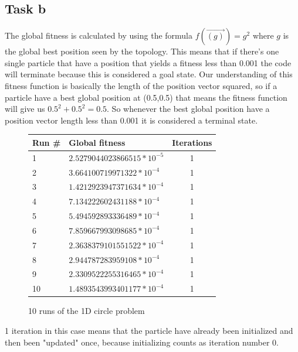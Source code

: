 \documentclass[12pt, a4paper]{article}
\begin{document}
\subsection{Task b}
The global fitness is calculated by using the formula $f(\vec{(g)})=g^2$ where $g$ is the global best position seen by the topology. This means that if there's one single particle that have a position that yields a fitness less than 0.001 the code will terminate because this is considered a goal state. Our understanding of this fitness function is basically the length of the position vector squared, so if a particle have a best global position at (0.5,0.5) that means the fitness function will give us $0.5^2 + 0.5^2 = 0.5$. So whenever the best global position have a position vector length less than 0.001 it is considered a terminal state.
\begin{figure}[H]
\begin{center}
\begin{tabular}{l| l  c}
Run \# & Global fitness& Iterations\\ \hline
1&$2.5279044023866515*10^{-5}$ & 1 \\
2&$3.664100719971322*10^{-4}$ & 1 \\
3&$1.4212923947371634*10^{-4}$ & 1 \\
4&$7.134222602431188*10^{-4}$ & 1 \\
5&$5.494592893336489*10^{-4}$ & 1 \\
6&$7.859667993098685*10^{-4}$ & 1 \\
7&$2.3638379101551522*10^{-4}$ & 1 \\
8&$2.944787283959108*10^{-4}$ & 1 \\
9&$2.3309522255316465*10^{-4}$ & 1 \\
10&$1.4893543993401177*10^{-4}$ & 1 \\
\end{tabular}
\caption{10 runs of the 1D circle problem}
\end{center}
\end{figure}
1 iteration in this case means that the particle have already been initialized and then been "updated" once, because initializing counts as iteration number 0.
\end{document}
